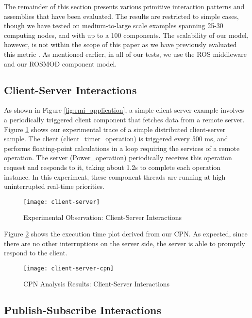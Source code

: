 The remainder of this section presents various primitive interaction patterns and assemblies that have been evaluated. The results are restricted to simple cases, though we have tested on medium-to-large scale examples spanning 25-30 computing nodes, and with up to a 100 components. The scalability of our model, however, is not within the scope of this paper as we have previously evaluated this metric \cite{SEUS}. As mentioned earlier, in all of our tests, we use the ROS \cite{ROS} middleware and our ROSMOD \cite{kumarROSMOD} component model. 

\subsection{Client-Server Interactions}

As shown in Figure \ref{fig:rmi_application}, a simple client server example involves a periodically triggered client component that fetches data from a remote server. Figure \ref{fig:client-server} shows our experimental trace of a simple distributed client-server sample. The client (client\_timer\_operation) is triggered every 500 ms, and performs floating-point calculations in a loop requiring the services of a remote operation.  %
The server (Power\_operation) periodically receives this operation request and responds to it, taking about 1.2s to complete each operation instance. In this experiment, these component threads are running at high uninterrupted real-time priorities. 

\begin{figure}[h]
	\centering
	\texttt{[image: client-server]}
	\caption{Experimental Observation: Client-Server Interactions}
	\label{fig:client-server}
\end{figure}
\FloatBarrier

Figure \ref{fig:client-server-cpn} shows the execution time plot derived from our CPN. As expected, since there are no other interruptions on the server side, the server is able to promptly respond to the client.

\begin{figure}[h]
	\centering
	\texttt{[image: client-server-cpn]}
	\caption{CPN Analysis Results: Client-Server Interactions}
	\label{fig:client-server-cpn}
\end{figure}
\FloatBarrier

\subsection{Publish-Subscribe Interactions}


